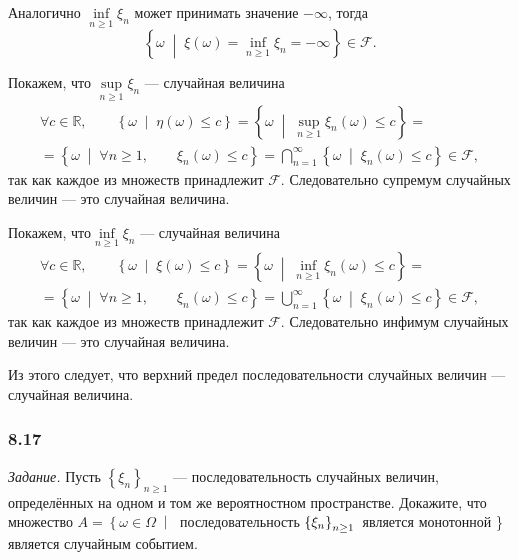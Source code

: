 Аналогично $ \inf \limits_{n \geq 1} \xi_n $ может принимать значение $- \infty $,
тогда
$$ \left\{ \omega \; \middle| \; \xi \left( \omega \right) =
\inf \limits_{n \geq 1} \xi_n =
- \infty \right\} \in \mathcal{F}.$$

Покажем, что $ \sup \limits_{n \geq 1} \xi_n $ --- случайная величина
\begin{equation*}
\begin{split}
\forall c \in \mathbb{R}, \qquad \left\{ \omega \; \middle| \; \eta \left( \omega \right) \leq c \right\} =
\left\{ \omega \; \middle| \; \sup \limits_{n \geq 1} \xi_n \left( \omega \right) \leq c \right\} = \\
= \left\{ \omega \; \middle| \; \forall n \geq 1, \qquad \xi_n \left( \omega \right) \leq c \right\} =
\bigcap \limits_{n=1}^{ \infty } \left\{ \omega \; \middle| \; \xi_n \left( \omega \right) \leq c \right\} \in \mathcal{F},
\end{split}
\end{equation*}
так как каждое из множеств принадлежит $ \mathcal{F} $.
Следовательно супремум случайных величин --- это случайная величина.

Покажем, что$ \inf \limits_{n \geq 1} \xi_n $ --- случайная величина
\begin{equation*}
\begin{split}
\forall c \in \mathbb{R}, \qquad \left\{ \omega \; \middle| \; \xi \left( \omega \right) \leq c \right\} =
\left\{ \omega \; \middle| \; \inf \limits_{n \geq 1} \xi_n \left( \omega \right) \leq c \right\} = \\
= \left\{ \omega \; \middle| \; \forall n \geq 1, \qquad \xi_n \left( \omega \right) \leq c \right\} =
\bigcup \limits_{n=1}^{ \infty } \left\{ \omega \; \middle| \; \xi_n \left( \omega \right) \leq c \right\} \in \mathcal{F},
\end{split}
\end{equation*}
так как каждое из множеств принадлежит $ \mathcal{F} $.
Следовательно инфимум случайных величин --- это случайная величина.

Из этого следует, что верхний предел последовательности случайных величин --- случайная величина.

\subsubsection*{8.17}

\textit{Задание.} Пусть $ \left\{ \xi_n \right\}_{n \geq 1} $ --- последовательность случайных величин, определённых на одном и том же вероятностном пространстве.
Докажите,
что множество
$A = \left\{ \omega \in \Omega \; \middle| \; \right. $ последовательность $ \left\{ \xi_n \right\}_{n \geq 1} \\
$ является монотонной \} является случайным событием.

